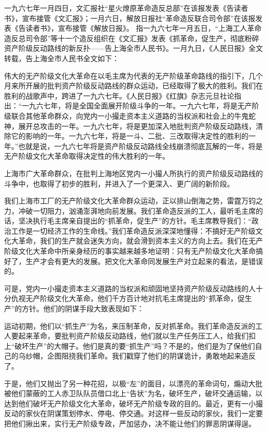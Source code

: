 \begin{maonote}
一九六七年一月四日，文汇报社“星火燎原革命造反总部”在该报发表《告读者书》，宣布接管《文汇报》；一月六日，解放日报社“革命造反联合司令部”在该报发表《告读者书》，宣布接管《解放日报》。
指一九六七年一月五日，“上海工人革命造反总司令部”等十一个造反组织在《文汇报》发表《抓革命，促生产，彻底粉碎资产阶级反动路线的新反扑——告上海全市人民书》。一月九日，《人民日报》全文转载，告上海全市人民书全文如下：

伟大的无产阶级文化大革命在以毛主席为代表的无产阶级革命路线的指引下，几个月来所开展的批判资产阶级反动路线的群众运动，已经取得了极大的胜利。我们在胜利的战歌声中，跨进了一九六七年。《人民日报》《红旗》杂志元旦社论指出：“一九六七年，将是全国全面展开阶级斗争的一年。一九六七年，将是无产阶级联合其他革命群众，向党内一小撮走资本主义道路的当权派和社会上的牛鬼蛇神，展开总攻击的一年。一九六七年，将是更加深入地批判资产阶级反动路线，清除它的影响的一年。一九六七年，将是一斗、二批、三改取得决定性的胜利的一年。”也就是说，一九六七年将是资产阶级反动路线全线崩溃彻底瓦解的一年，将是无产阶级文化大革命取得决定性的伟大胜利的一年。

上海市广大革命群众，在批判上海地区党内一小撮人所执行的资产阶级反动路线的斗争中，也取得了初步的胜利，并进入了一个更深入、更广阔的新阶段。

我们上海市工厂的无产阶级文化大革命群众运动，正以排山倒海之势，雷霆万钧之力，冲破一切阻力，汹涌澎湃地向前发展。我们革命造反派的工人，最听毛主席的话，坚决执行毛主席亲自提出的“抓革命，促生产”的方针。毛主席教导我们：“政治工作是一切经济工作的生命线。”我们革命造反派深深地懂得：不搞好无产阶级文化大革命，我们的生产就会迷失方向，就会滑到资本主义的方向上去。我们在无产阶级文化大革命中所亲身经历的事实越来越多地证明：只有无产阶级文化大革命搞好了，生产才会有更大的发展。把文化大革命同发展生产对立起来的看法，是错误的。

可是，党内一小撮走资本主义道路的当权派和顽固地坚持资产阶级反动路线的人十分仇视无产阶级文化大革命，他们千方百计地对抗毛主席提出的“抓革命，促生产”的方针。他们的阴谋手段大致表现如下：

运动初期，他们以“抓生产”为名，来压制革命，反对抓革命。我们革命造反派的工人要起来革命，要批判资产阶级反动路线，他们就以生产任务压工人，给我们扣上“破坏生产”的大帽子。他们是真的要“抓生产”吗？不是的，他们是为了保他们自己的乌纱帽，企图阻挠我们革命。我们戳穿了他们的阴谋诡计，勇敢地起来造反了。

于是，他们又抛出了另一种花招，以极“左”的面目，以漂亮的革命词句，煽动大批被他们蒙蔽的工人赤卫队队员借口北上“告状”为名，破坏生产，破坏交通运输，以达到他们破坏无产阶级文化大革命，破坏无产阶级专政的目的。最近，更有一小撮反动的家伙在阴谋策划停水、停电、停交通。对这样一些反动的家伙，我们一定要把他们揪出来，实行无产阶级专政，严加惩办，决不能让他们的罪恶阴谋得逞。


\end{maonote}
